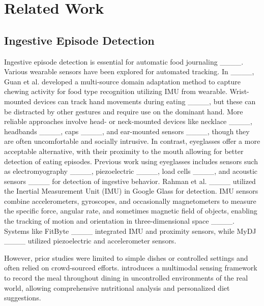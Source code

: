 \section{Related Work}
\label{sec:related_work}
\subsection{Ingestive Episode Detection}
\label{dietarydetection}
Ingestive episode detection is essential for automatic food journaling ____. 
Various wearable sensors have been explored for automated tracking. In ____, Guan et al. developed a multi-source domain adaptation method to capture chewing activity for food type recognition utilizing IMU from wearable. Wrist-mounted devices can track hand movements during eating ____, but these can be distracted by other gestures and require use on the dominant hand. More reliable approaches involve head- or neck-mounted devices like necklace ____, headbands ____, caps ____, and ear-mounted sensors ____, though they are often uncomfortable and socially intrusive. 
In contrast, eyeglasses offer a more acceptable alternative, with their proximity to the mouth allowing for better detection of eating episodes. Previous work using eyeglasses includes sensors such as electromyography ____, piezoelectric ____, load cells ____, and acoustic sensors ____ for detection of ingestive behavior. 
Rahman et al. ____ utilized the Inertial Measurement Unit (IMU) in Google Glass for detection. IMU sensors combine accelerometers, gyroscopes, and occasionally magnetometers to measure the specific force, angular rate, and sometimes magnetic field of objects, enabling the tracking of motion and orientation in three-dimensional space ____.
Systems like FitByte ____ integrated IMU and proximity sensors, while MyDJ ____ utilized piezoelectric and accelerometer sensors. 

However, prior studies were limited to simple dishes or controlled settings and often relied on crowd-sourced efforts. \shortname introduces a multimodal sensing framework to record the meal throughout dining in uncontrolled environments of the real world, allowing comprehensive nutritional analysis and personalized diet suggestions.

